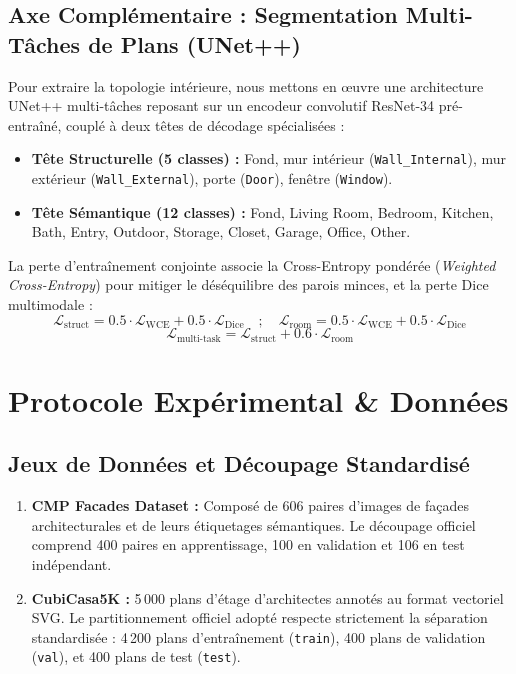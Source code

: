 \documentclass[11pt,a4paper]{report}
\begin{document}
\section{Axe Complémentaire : Segmentation Multi-Tâches de Plans (UNet++)}
Pour extraire la topologie intérieure, nous mettons en œuvre une architecture UNet++ multi-tâches reposant sur un encodeur convolutif ResNet-34 pré-entraîné, couplé à deux têtes de décodage spécialisées :
\begin{itemize}
    \item \textbf{Tête Structurelle (5 classes) :} Fond, mur intérieur (\texttt{Wall\_Internal}), mur extérieur (\texttt{Wall\_External}), porte (\texttt{Door}), fenêtre (\texttt{Window}).
    \item \textbf{Tête Sémantique (12 classes) :} Fond, Living Room, Bedroom, Kitchen, Bath, Entry, Outdoor, Storage, Closet, Garage, Office, Other.
\end{itemize}

La perte d'entraînement conjointe associe la Cross-Entropy pondérée (\emph{Weighted Cross-Entropy}) pour mitiger le déséquilibre des parois minces, et la perte Dice multimodale :
\begin{equation}
    \mathcal{L}_{\text{struct}} = 0.5 \cdot \mathcal{L}_{\text{WCE}} + 0.5 \cdot \mathcal{L}_{\text{Dice}} \quad ; \quad \mathcal{L}_{\text{room}} = 0.5 \cdot \mathcal{L}_{\text{WCE}} + 0.5 \cdot \mathcal{L}_{\text{Dice}}
\end{equation}
\begin{equation}
    \mathcal{L}_{\text{multi-task}} = \mathcal{L}_{\text{struct}} + 0.6 \cdot \mathcal{L}_{\text{room}}
\end{equation}

\newpage

\chapter{Protocole Expérimental \& Données}

\section{Jeux de Données et Découpage Standardisé}
\begin{enumerate}
    \item \textbf{CMP Facades Dataset :} Composé de 606 paires d'images de façades architecturales et de leurs étiquetages sémantiques. Le découpage officiel comprend 400 paires en apprentissage, 100 en validation et 106 en test indépendant.
    \item \textbf{CubiCasa5K :} 5\,000 plans d'étage d'architectes annotés au format vectoriel SVG. Le partitionnement officiel adopté respecte strictement la séparation standardisée : 4\,200 plans d'entraînement (\texttt{train}), 400 plans de validation (\texttt{val}), et 400 plans de test (\texttt{test}).
\end{enumerate}
\end{document}
